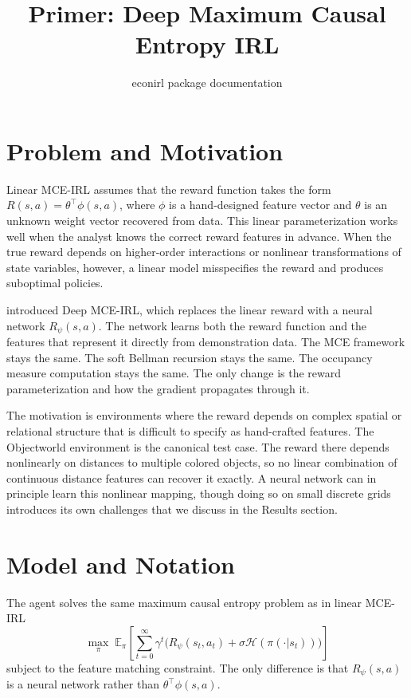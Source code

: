 \documentclass[10pt]{article}
\title{Primer: Deep Maximum Causal Entropy IRL}
\author{econirl package documentation}
\date{}
\newcommand{\E}{\mathbb{E}}
\newcommand{\calH}{\mathcal{H}}
\begin{document}
\maketitle


\section{Problem and Motivation}

Linear MCE-IRL \citep{ziebart2010} assumes that the reward function takes the form $R(s,a) = \theta^\top\phi(s,a)$, where $\phi$ is a hand-designed feature vector and $\theta$ is an unknown weight vector recovered from data. This linear parameterization works well when the analyst knows the correct reward features in advance. When the true reward depends on higher-order interactions or nonlinear transformations of state variables, however, a linear model misspecifies the reward and produces suboptimal policies.

\citet{wulfmeier2016} introduced Deep MCE-IRL, which replaces the linear reward with a neural network $R_\psi(s,a)$. The network learns both the reward function and the features that represent it directly from demonstration data. The MCE framework stays the same. The soft Bellman recursion stays the same. The occupancy measure computation stays the same. The only change is the reward parameterization and how the gradient propagates through it.

The motivation is environments where the reward depends on complex spatial or relational structure that is difficult to specify as hand-crafted features. The Objectworld environment \citep{wulfmeier2016} is the canonical test case. The reward there depends nonlinearly on distances to multiple colored objects, so no linear combination of continuous distance features can recover it exactly. A neural network can in principle learn this nonlinear mapping, though doing so on small discrete grids introduces its own challenges that we discuss in the Results section.


\section{Model and Notation}

The agent solves the same maximum causal entropy problem as in linear MCE-IRL
\begin{equation}
\label{eq:mce_objective}
\max_\pi \; \E_\pi\!\left[\sum_{t=0}^{\infty} \gamma^t \bigl(R_\psi(s_t, a_t) + \sigma \calH(\pi(\cdot | s_t))\bigr)\right]
\end{equation}
subject to the feature matching constraint. The only difference is that $R_\psi(s,a)$ is a neural network rather than $\theta^\top\phi(s,a)$.
\end{document}
